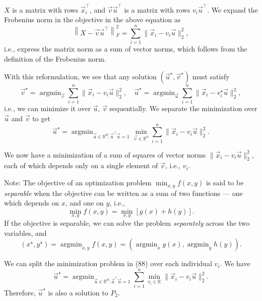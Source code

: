 \documentclass[10pt]{article}
\theoremstyle{definition}
\theoremstyle{plain}
\newcommand{\RR}{\mathbb{R}}
\DeclareMathOperator{\argmin}{argmin}
\begin{document}
\begin{enumerate}[label=(\alph*)]
$X$ is a matrix with rows $\vec{x}_i^\top$, and $\vec{v}\vec{u}^\top$ is a matrix with rows $v_i \vec{u}^\top$. We expand the Frobenius norm in the objective in the above equation as
\begin{equation}
\left\|X - \vec{v}\vec{u}^\top\right\|_F^2 = \sum_{i=1}^{n} \|\vec{x}_i - v_i \vec{u}\|_2^2,
\end{equation}
i.e., express the matrix norm as a sum of vector norms, which follows from the definition of the Frobenius norm.

With this reformulation, we see that any solution $(\vec{u}^\star, \vec{v}^\star)$ must satisfy
\begin{equation}
\vec{v}^\star = \argmin_{\vec{v}} \sum_{i=1}^{n} \|\vec{x}_i - v_i \vec{u}\|_2^2, \quad \vec{u}^\star = \argmin_{\vec{u}} \sum_{i=1}^{n} \|\vec{x}_i - v_i^\star \vec{u}\|_2^2,
\end{equation}
i.e., we can minimize it over $\vec{u}$, $\vec{v}$ sequentially. We separate the minimization over $\vec{u}$ and $\vec{v}$ to get
\begin{equation}
\vec{u}^\star = \argmin_{\vec{u} \in \RR^d : \vec{u}^\top \vec{u} = 1} \min_{\vec{v} \in \RR^n} \sum_{i=1}^{n} \|\vec{x}_i - v_i \vec{u}\|_2^2.
\end{equation}

We now have a minimization of a sum of squares of vector norms $\|\vec{x}_i - v_i \vec{u}\|_2^2$, each of which depends only on a single element of $\vec{v}$, i.e., $v_i$.

Note: The objective of an optimization problem $\min_{x,y} f(x,y)$ is said to be \textit{separable} when the objective can be written as a sum of two functions --- one which depends on $x$, and one on $y$, i.e.,
\begin{equation}
\min_{x,y} f(x,y) = \min_{x,y} [g(x) + h(y)].
\end{equation}
If the objective is separable, we can solve the problem \textit{separately} across the two variables, and
\begin{equation}
(x^\star, y^\star) = \argmin_{x,y} f(x,y) = (\argmin_x g(x), \argmin_y h(y)).
\end{equation}

We can split the minimization problem in (88) over each individual $v_i$. We have
\begin{equation}
\vec{u}^\star = \argmin_{\vec{u} \in \RR^d : \vec{u}^\top \vec{u} = 1} \sum_{i=1}^{n} \min_{v_i \in \RR} \|\vec{x}_i - v_i \vec{u}\|_2^2.
\end{equation}
Therefore, $\vec{u}^\star$ is also a solution to $P_2$.
\end{enumerate}
\end{document}

